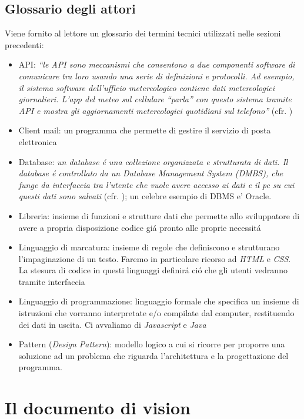 \documentclass[12pt]{article}
\begin{document}
\subsection{Glossario degli attori}

Viene fornito al lettore un glossario dei termini tecnici utilizzati nelle sezioni precedenti:
\begin{itemize}
	\item API: \textit{``le API sono meccanismi che consentono a due componenti software di comunicare tra loro usando una serie di definizioni e protocolli. Ad esempio, il sistema software dell'ufficio metereologico contiene dati metereologici giornalieri. L'app del meteo sul cellulare ``parla'' con questo sistema tramite API e mostra gli aggiornamenti metereologici quotidiani sul telefono''} (cfr. \cite{bworld})
	\item Client mail: un programma che permette di gestire il servizio di posta elettronica 
	\item Database: \textit{un database \'e una collezione organizzata e strutturata di dati. Il database \'e controllato da un Database Management System (DMBS), che funge da interfaccia tra l'utente che vuole avere accesso ai dati e il pc su cui questi dati sono salvati} (cfr. \cite{database}); un celebre esempio di DBMS e' Oracle. 
	\item Libreria: insieme di funzioni e strutture dati che permette allo sviluppatore di avere a propria disposizione codice gi\'a pronto alle proprie necessit\'a
	\item Linguaggio di marcatura: insieme di regole che definiscono e strutturano l'impaginazione di un testo. Faremo in particolare ricorso ad \textit{HTML} e \textit{CSS}. La stesura di codice in questi linguaggi definir\'a ci\'o che gli utenti vedranno tramite interfaccia
	\item Linguaggio di programmazione: linguaggio formale che specifica un insieme di istruzioni che vorranno interpretate e/o compilate dal computer, restituendo dei dati in uscita. Ci avvaliamo di \textit{Javascript} e \textit{Java}
	\item Pattern (\textit{Design Pattern}): modello logico a cui si ricorre per proporre una soluzione ad un problema che riguarda l'architettura e la progettazione del programma. 
\end{itemize}


\section{Il documento di vision}
\end{document}
